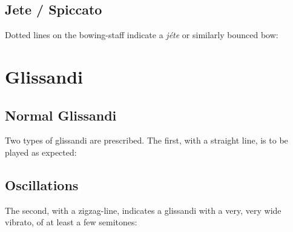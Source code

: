 \begin{multicols}{2}
\begin{figurehere}
\end{figurehere}

\subsection{Jete / Spiccato}

Dotted lines on the bowing-staff indicate a \emph{jéte} or similarly bounced bow:\\

\begin{figurehere}
\end{figurehere}

\section{Glissandi}

\subsection{Normal Glissandi}

Two types of glissandi are prescribed.  The first, with a straight line, is to be played as expected:\\

\begin{figurehere}
\end{figurehere}

\subsection{Oscillations}

The second, with a zigzag-line, indicates a glissandi with a very, very wide vibrato, of at least a few semitones:\\

\begin{figurehere}
\end{figurehere}

\end{multicols}